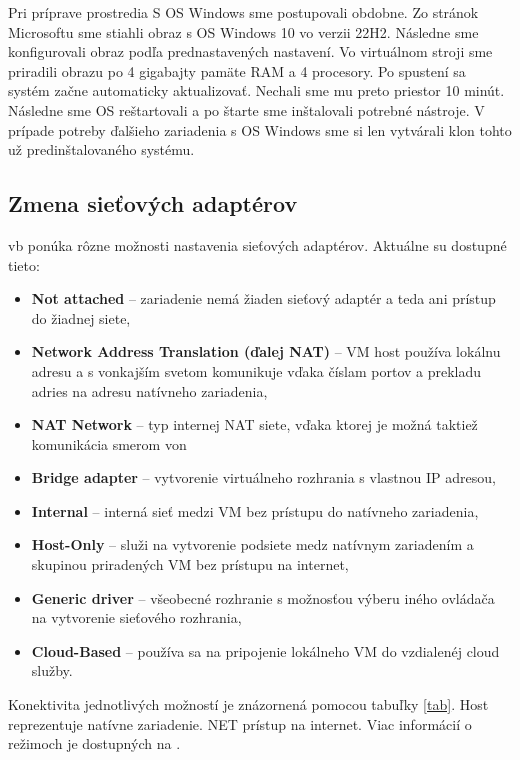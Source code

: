 Pri príprave prostredia S OS Windows sme postupovali obdobne. Zo stránok Microsoftu sme stiahli obraz s OS Windows 10 vo verzii 22H2. Následne sme konfigurovali obraz podľa prednastavených nastavení. Vo virtuálnom stroji sme priradili obrazu po 4 gigabajty pamäte RAM a 4 procesory. Po spustení sa systém začne automaticky aktualizovať. Nechali sme mu preto priestor 10 minút. Následne sme OS reštartovali a po štarte sme inštalovali potrebné nástroje. V prípade potreby ďalšieho zariadenia s OS Windows sme si len vytvárali klon tohto už predinštalovaného systému.

\subsection{Zmena sieťových adaptérov}
\acrshort{vb} ponúka rôzne možnosti nastavenia sieťových adaptérov. Aktuálne su dostupné tieto:
\begin{itemize}
	\item{\textbf{Not attached}} -- zariadenie nemá žiaden sieťový adaptér a teda ani prístup do žiadnej siete,
	\item{\textbf{Network Address Translation (ďalej NAT)}} -- VM host používa lokálnu adresu a s vonkajším svetom komunikuje vďaka číslam portov a prekladu adries na adresu natívneho zariadenia,
	\item{\textbf{NAT Network}} -- typ internej NAT siete, vďaka ktorej je možná taktiež komunikácia smerom von
	\item{\textbf{Bridge adapter}} -- vytvorenie virtuálneho rozhrania s vlastnou IP adresou,
	\item{\textbf{Internal}} -- interná sieť medzi VM bez prístupu do natívneho zariadenia,
	\item{\textbf{Host-Only}} -- služi na vytvorenie podsiete medz natívnym zariadením a skupinou priradených VM bez prístupu na internet,
	\item{\textbf{Generic driver}} -- všeobecné rozhranie s možnosťou výberu iného ovládača na vytvorenie sieťového rozhrania,
	\item{\textbf{Cloud-Based}} -- používa sa na pripojenie lokálneho VM do vzdialenéj cloud služby.
\end{itemize} 

Konektivita jednotlivých možností je znázornená pomocou tabuľky \ref{tab}. Host reprezentuje natívne zariadenie. NET prístup na internet. Viac informácií o režimoch je dostupných na \cite{vboracle}.

